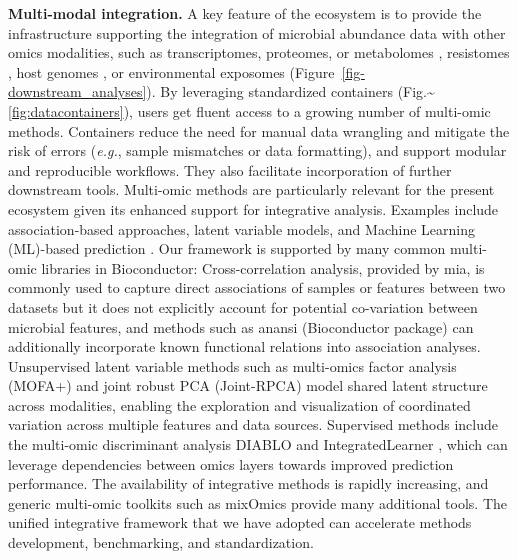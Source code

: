 \documentclass[
  sn-nature,
]{sn-jnl}
\begin{document}
\textbf{Multi-modal integration.} A key feature of the ecosystem is to
provide the infrastructure supporting the integration of microbial
abundance data with other omics modalities, such as transcriptomes,
proteomes, or metabolomes \citep{hintikka2021, mangnier2025}, resistomes
\citep{salehi2025, lee2023}, host genomes \citep{qin2022}, or
environmental exposomes (Figure~\ref{fig-downstream_analyses}). By
leveraging standardized containers
(Fig.\textasciitilde{}\ref{fig:datacontainers}), users get fluent access
to a growing number of multi-omic methods. Containers reduce the need
for manual data wrangling and mitigate the risk of errors (\emph{e.g.},
sample mismatches or data formatting), and support modular and
reproducible workflows. They also facilitate incorporation of further
downstream tools. Multi-omic methods are particularly relevant for the
present ecosystem given its enhanced support for integrative analysis.
Examples include association-based approaches, latent variable models,
and Machine Learning (ML)-based prediction
\citep{sankaran2019, sankaran2019b, sherwani2025}. Our framework is
supported by many common multi-omic libraries in Bioconductor:
Cross-correlation analysis, provided by mia, is commonly used to capture
direct associations of samples or features between two datasets but it
does not explicitly account for potential co-variation between microbial
features, and methods such as anansi (Bioconductor package) can
additionally incorporate known functional relations into association
analyses. Unsupervised latent variable methods such as multi-omics
factor analysis (MOFA+) \citep{argelaguet2020} and joint robust PCA
(Joint-RPCA) \citep{vargas2026} model shared latent structure across
modalities, enabling the exploration and visualization of coordinated
variation across multiple features and data sources. Supervised methods
include the multi-omic discriminant analysis DIABLO \citep{singh2019}
and IntegratedLearner \citep{mallick2024}, which can leverage
dependencies between omics layers towards improved prediction
performance. The availability of integrative methods is rapidly
increasing, and generic multi-omic toolkits such as mixOmics
\citep{rohart2017} provide many additional tools. The unified
integrative framework that we have adopted can accelerate methods
development, benchmarking, and standardization.
\end{document}
